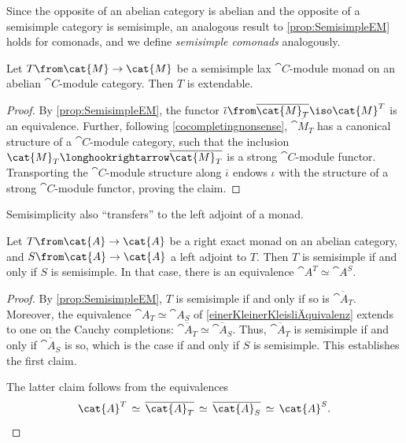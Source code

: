 Since the opposite of an abelian category is abelian and the opposite of a semisimple category is semisimple,
an analogous result to \cref{prop:SemisimpleEM} holds for comonads,
and we define \emph{semisimple comonads} analogously.

\begin{proposition}\label{extendingsemisimple}
  Let \(T\from \cat{M} \to \cat{M}\) be a semisimple lax \(\cat{C}\)\hyp{}module monad on an abelian \(\cat{C}\)\hyp{}module category.
  Then \(T\) is extendable.
\end{proposition}
\begin{proof}
  By \cref{prop:SemisimpleEM}, the functor \(\overline{\iota}\from \overline{\cat{M}_T} \iso \cat{M}^T\) is an equivalence.
  Further, following \cref{cocompletingnonsense},
  \(\overline{\cat{M}_T}\) has a canonical structure of a \(\cat{C}\)\hyp{}module category,
  such that the inclusion \(\cat{M}_T \longhookrightarrow \overline{\cat{M}_T}\) is a strong \(\cat{C}\)\hyp{}module functor.
  Transporting the \(\cat{C}\)\hyp{}module structure along \(\overline{\iota}\) endows \(\iota\) with the structure of a strong \(\cat{C}\)\hyp{}module functor,
  proving the claim.
\end{proof}

Semisimplicity also ``transfers'' to the left adjoint of a monad.

\begin{lemma}\label{semisimpleleftandright}
  Let \(T\from \cat{A} \to \cat{A}\) be a right exact monad on an abelian category, and \(S\from \cat{A} \to \cat{A}\) a left adjoint to \(T\).
  Then \(T\) is semisimple if and only if \(S\) is semisimple.
  In that case, there is an equivalence \(\cat{A}^T \simeq \cat{A}^{S}\).
\end{lemma}
\begin{proof}
  By \cref{prop:SemisimpleEM}, \(T\) is semisimple if and only if so is \(\overline{\cat{A}_T}\).
  Moreover, the equivalence \(\cat{A}_T \simeq \cat{A}_S\) of \cref{einerKleinerKleisliÄquivalenz}
  extends to one on the Cauchy completions: \(\overline{\cat{A}_T} \simeq \overline{\cat{A}_S}\).
  Thus, \(\overline{\cat{A}_T}\) is semisimple if and only if \(\overline{\cat{A}_S}\) is so,
  which is the case if and only if \(S\) is semisimple.
  This establishes the first claim.

  The latter claim follows from the equivalences
  \[
    \cat{A}^T \,\simeq\, \overline{\cat{A}_T} \,\simeq\, \overline{\cat{A}_S} \,\simeq\, \cat{A}^{S}.\qedhere
  \]
\end{proof}

